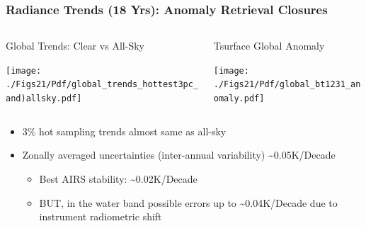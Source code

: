 \documentclass[10pt,t]{beamer}
\begin{document}
\begin{frame}
\frametitle{Radiance Trends (18 Yrs): Anomaly Retrieval Closures}
\vspace{-0.35in}

\begin{columns}
\begin{column}{0.55\columnwidth}
\begin{block}{\footnotesize Global Trends: Clear vs All-Sky}
\vspace{-0.1in}
\begin{center}
\texttt{[image: ./Figs21/Pdf/global\_trends\_hottest3pc\_and)allsky.pdf]}
\end{center}
\end{block}
\end{column}


\begin{column}{0.5\columnwidth}
\begin{block}{\footnotesize Tsurface Global Anomaly}
\vspace{-0.05in}
\begin{center}
\texttt{[image: ./Figs21/Pdf/global\_bt1231\_anomaly.pdf]}
\end{center}
\end{block}
\end{column}
\end{columns}

\vspace{-0.1in}
\small
\begin{itemize}
\item 3\% hot sampling trends almost same as all-sky
\item Zonally averaged uncertainties (inter-annual variability) \textasciitilde{}0.05K/Decade
\begin{itemize}
\item Best AIRS stability: \textasciitilde{}0.02K/Decade
\item BUT, in the water band possible errors up to \textasciitilde{}0.04K/Decade due to instrument radiometric shift
\end{itemize}
\end{itemize}
\end{frame}
\end{document}
